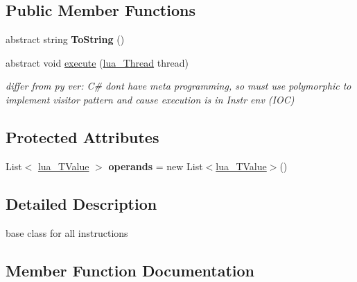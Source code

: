 \subsection*{Public Member Functions}
\begin{DoxyCompactItemize}
\item 
\mbox{\label{classzlua_1_1_assembled_instr_a469a0a7a028bfa2bcc06920e1f6d45d6}} 
abstract string {\bfseries To\+String} ()
\item 
abstract void \mbox{\hyperlink{classzlua_1_1_assembled_instr_a44e081c4565b90b75e4a67b8dd418feb}{execute}} (\mbox{\hyperlink{classzlua_1_1lua___thread}{lua\+\_\+\+Thread}} thread)
\begin{DoxyCompactList}\small\item\em differ from py ver\+: C\# dont have meta programming, so must use polymorphic to implement visitor pattern and cause execution is in Instr env (I\+OC) \end{DoxyCompactList}\end{DoxyCompactItemize}
\subsection*{Protected Attributes}
\begin{DoxyCompactItemize}
\item 
\mbox{\label{classzlua_1_1_assembled_instr_a5adc24105bcb8588365861da83919070}} 
List$<$ \mbox{\hyperlink{classzlua_1_1lua___t_value}{lua\+\_\+\+T\+Value}} $>$ {\bfseries operands} = new List$<$\mbox{\hyperlink{classzlua_1_1lua___t_value}{lua\+\_\+\+T\+Value}}$>$()
\end{DoxyCompactItemize}


\subsection{Detailed Description}
base class for all instructions 



\subsection{Member Function Documentation}
\mbox{\label{classzlua_1_1_assembled_instr_a44e081c4565b90b75e4a67b8dd418feb}} 
